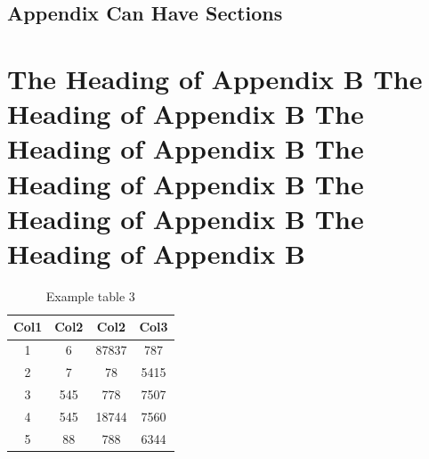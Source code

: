 \documentclass[debug, font=Times]{gw-dissertation}[2021/11/19]
\begin{document}
    \section{Appendix Can Have Sections}
    \lipsum[6]

\chapter{
    The Heading of Appendix B
    The Heading of Appendix B
    The Heading of Appendix B
    The Heading of Appendix B
    The Heading of Appendix B
    The Heading of Appendix B
}
\lipsum[7]
\begin{table}[h!]
    \centering
    \begin{tabular}{||c c c c||}
         \hline
         Col1 & Col2 & Col2 & Col3 \\ [0.5ex]
         \hline\hline
         1 & 6 & 87837 & 787 \\
         2 & 7 & 78 & 5415 \\
         3 & 545 & 778 & 7507 \\
         4 & 545 & 18744 & 7560 \\
         5 & 88 & 788 & 6344 \\ [1ex]
         \hline
    \end{tabular}
    \caption{Example table 3}
\end{table}
\lipsum[1]
\end{document}
